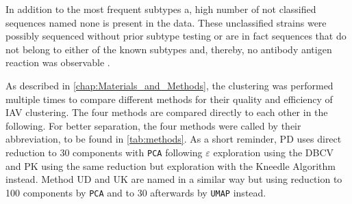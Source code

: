
In addition to the most frequent subtypes a, high number of not classified sequences named \glqq none\grqq{} is present in the data. These unclassified strains were possibly sequenced without prior subtype testing or are in fact sequences that do not belong to either of the known subtypes and, thereby, no antibody antigen reaction was observable \autocite{noauthor_revision_1980}.

\vspace{1em}

As described in \autoref{chap:Materials_and_Methods}, the clustering was performed multiple times to compare different methods for their quality and efficiency of \gls{IAV} clustering. The four methods are compared directly to each other in the following. For better separation, the four methods were called by their abbreviation, to be found in \autoref{tab:methods}. As a short reminder, PD uses direct reduction to 30 components with \texttt{PCA} following $\varepsilon$ exploration using the \gls{DBCV} and PK using the same reduction but exploration with the Kneedle Algorithm instead. Method UD and UK are named in a similar way but using reduction to 100 components by \texttt{PCA} and to 30 afterwards by \texttt{UMAP} instead. 

